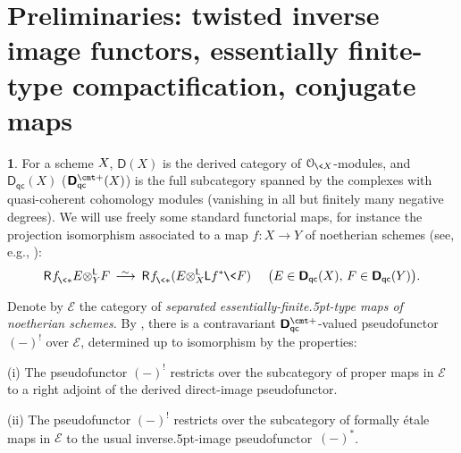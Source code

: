 \documentclass{compositio}
\theoremstyle{plain}
\theoremstyle{definition}
\newtheorem{cosa}[thm]{}
\theoremstyle{remark}
\numberwithin{equation}{thm}
\begin{document}
\medskip

\section{Preliminaries: twisted inverse image functors, essentially finite-type compactification, conjugate maps}
\label{prelims}

\begin{cosa}\label{^!} 
For a scheme $X{\mkern-1mu}$, ${\boldsymbol{\mathsf{D}}}(X)$ is the derived category of ${\mathcal O_{{\mkern-1mu}\<X}}$-modules, and 
${{\boldsymbol{\mathsf{D}}}_{\mathsf{qc}}}(X)$ (${{\boldsymbol{\mathsf{D}}}_{\mathsf{qc}}^{{\vbox to 0pt{\vskip-.95 ex\hbox{$\scriptstyle \text{\cmt\char'053}$}\vss}}}}(X)$) is the full subcategory spanned by the complexes with quasi-coherent cohomology modules (vanishing in all but finitely many negative degrees). We will use freely some standard functorial maps, for instance the 
projection isomorphism associated to a map $f\colon X\to Y$ of noetherian schemes (see, e.g., \cite[3.9.4]{li}):
\[{\mathsf R}{\mkern1mu}{{f^{}_{{\mkern-1mu}\<*}}} E{\otimes^{\mathsf L}_{{Y}}}{\mkern-1mu} F{{\mkern8mu\longrightarrow \mkern-25.5mu{}^\sim\mkern17mu}}{\mathsf R}{\mkern1mu}{{f^{}_{{\mkern-1mu}\<*}}}(E{\otimes^{\mathsf L}_{{X}}} {\mkern-1mu}{\mathsf L} f^*{\mkern-1mu}\<F)
\quad\ \big(E\in{{\boldsymbol{\mathsf{D}}}_{\mathsf{qc}}}(X), \,F\in{{\boldsymbol{\mathsf{D}}}_{\mathsf{qc}}}(Y)\big).
\] 

Denote by ${\mathscr{E}}$  the category of \emph{separated essentially-finite{\kern.5pt}-type maps of noetherian schemes.}
By \cite[5.2 and 5.3]{Nk}, there is a contravariant \mbox{${{\boldsymbol{\mathsf{D}}}_{\mathsf{qc}}^{{\vbox to 0pt{\vskip-.95 ex\hbox{$\scriptstyle \text{\cmt\char'053}$}\vss}}}}$-valued} pseudo\-functor $(-)^!$ over ${\mathscr{E}}$, determined up to isomorphism by the properties:{\vspace{2pt}}

{\rm(i)} The pseudofunctor $(-)^!$ restricts over the subcategory of proper maps in ${\mathscr{E}}$ to a right adjoint of the derived direct-image pseudofunctor.{\vspace{1pt}}

{\rm(ii)} The pseudofunctor $(-)^!$ restricts over the subcategory of formally \'etale maps in ${\mathscr{E}}$ to the usual inverse{\kern.5pt}-image pseudofunctor~$(-)^*$.{\vspace{1pt}}


\end{cosa}
\end{document}
